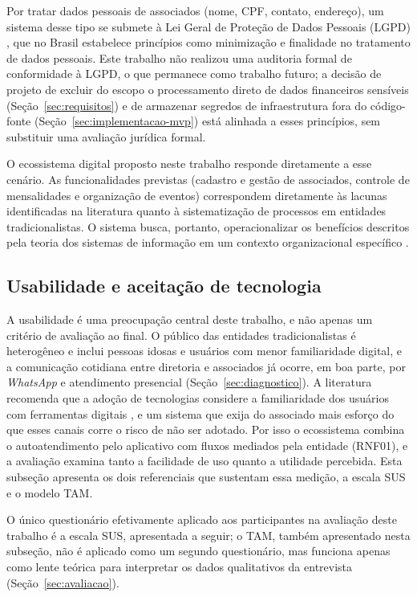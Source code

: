 \documentclass[12pt,a4paper]{article}
\begin{document}
Por tratar dados pessoais de associados (nome, CPF, contato, endereço), um sistema desse tipo se
submete à Lei Geral de Proteção de Dados Pessoais (LGPD) \parencite{lgpd2018}, que no Brasil
estabelece princípios como minimização e finalidade no tratamento de dados pessoais. Este trabalho
não realizou uma auditoria formal de conformidade à LGPD, o que permanece como trabalho futuro; a
decisão de projeto de excluir do escopo o processamento direto de dados financeiros sensíveis
(Seção~\ref{sec:requisitos}) e de armazenar segredos de infraestrutura fora do código-fonte
(Seção~\ref{sec:implementacao-mvp}) está alinhada a esses princípios, sem substituir uma avaliação
jurídica formal.

O ecossistema digital proposto neste trabalho responde diretamente a esse cenário. As funcionalidades
previstas (cadastro e gestão de associados, controle de mensalidades e organização de eventos)
correspondem diretamente às lacunas identificadas na literatura quanto à sistematização de processos
em entidades tradicionalistas. O sistema busca, portanto, operacionalizar os benefícios descritos
pela teoria dos sistemas de informação em um contexto organizacional específico
\parencite{laudon2011,delone2003}.

\subsection{Usabilidade e aceitação de tecnologia}
\label{sec:usabilidade}

A usabilidade é uma preocupação central deste trabalho, e não apenas um critério de avaliação ao
final. O público das entidades tradicionalistas é heterogêneo e inclui pessoas idosas e usuários com
menor familiaridade digital, e a comunicação cotidiana entre diretoria e associados já ocorre, em boa
parte, por \textit{WhatsApp} e atendimento presencial (Seção~\ref{sec:diagnostico}). A literatura
recomenda que a adoção de tecnologias considere a familiaridade dos usuários com ferramentas digitais
\parencite{verhoef2021}, e um sistema que exija do associado mais esforço do que esses canais corre o
risco de não ser adotado. Por isso o ecossistema combina o autoatendimento pelo aplicativo com fluxos
mediados pela entidade (RNF01), e a avaliação examina tanto a facilidade de uso quanto a utilidade
percebida. Esta subseção apresenta os dois referenciais que sustentam essa medição, a escala SUS e o
modelo TAM.

O único questionário efetivamente aplicado aos participantes na avaliação deste trabalho é a escala
SUS, apresentada a seguir; o TAM, também apresentado nesta subseção, não é aplicado como um segundo
questionário, mas funciona apenas como lente teórica para interpretar os dados qualitativos da
entrevista (Seção~\ref{sec:avaliacao}).
\end{document}
